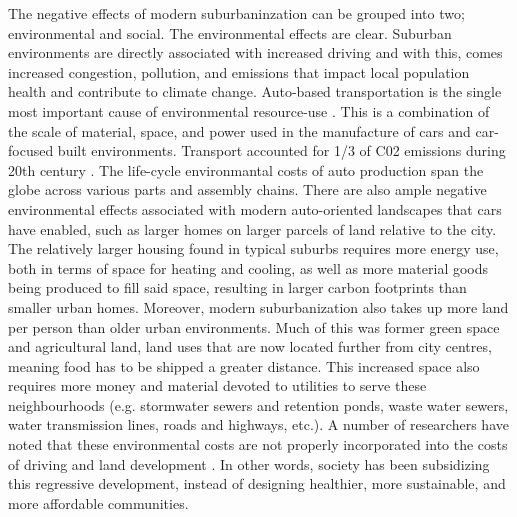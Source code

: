 The negative effects of modern suburbaninzation can be grouped into two; environmental and social. The environmental effects are clear. Suburban environments are directly associated with increased driving \cite{ewing_travel_2010,moos_suburban_2015} and with this, comes increased congestion, pollution, and emissions that impact local population health and contribute to climate change. Auto-based transportation is the single most important cause of environmental resource-use \cite{urry_systemautomobility_2004}. This is a combination of the scale of material, space, and power used in the manufacture of cars and car-focused built environments. Transport accounted for 1/3 of C02 emissions during 20th century \cite{urry_systemautomobility_2004}. The life-cycle environmantal costs of auto production span the globe across various parts and assembly chains. There are also ample negative environmental effects associated with modern auto-oriented landscapes that cars have enabled, such as larger homes on larger parcels of land relative to the city. The relatively larger housing found in typical suburbs requires more energy use, both in terms of space for heating and cooling, as well as more material goods being produced to fill said space, resulting in larger carbon footprints than smaller urban homes. Moreover, modern suburbanization also takes up more land per person than older urban environments. Much of this was former green space and agricultural land, land uses that are now located further from city centres, meaning food has to be shipped a greater distance. This increased space also requires more money and material devoted to utilities to serve these neighbourhoods (e.g. stormwater sewers and retention ponds, waste water sewers, water transmission lines, roads and highways, etc.). A number of researchers have noted that these environmental costs are not properly incorporated into the costs of driving and land development \cite{blais_perverse_2011,ewing_compactness_2015,kunstler_geography_1994}. In other words, society has been subsidizing this regressive development, instead of designing healthier, more sustainable, and more affordable communities.

